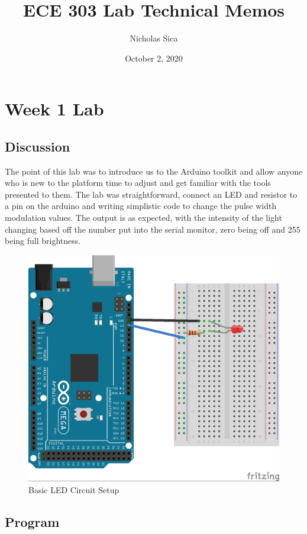 \documentclass[12pt,titlepage]{article}
\begin{document}
    \title{ECE 303 Lab Technical Memos}
    \author{Nicholas Sica}
    \date{October 2, 2020}
    \maketitle

    \tableofcontents
    \newpage

    \section{Week 1 Lab}
        \subsection{Discussion}
            The point of this lab was to introduce us to the Arduino toolkit and allow anyone who is new to the platform time to adjust and get familiar with the tools presented to them. The lab was straightforward, connect an LED and resistor to a pin on the arduino and writing simplistic code to change the pulse width modulation values. The output is as expected, with the intensity of the light changing based off the number put into the serial monitor, zero being off and 255 being full brightness.
            \begin{figure}[!htb]
                \centering
                \includegraphics[width=5.0in]{figure_1_1.png}
                \caption{Basic LED Circuit Setup}
                \label{Circuit}
            \end{figure}
        \subsection{Program}
        \begin{minipage}{\linewidth}
            
        \end{minipage}
\end{document}
